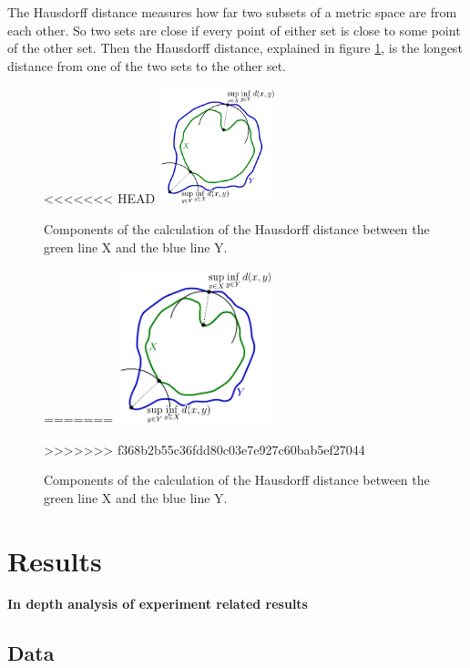 \documentclass[journal]{IEEEtran}
\begin{document}
	The Hausdorff distance measures how far two subsets of a metric space are from each other. So two sets are close if every point of either set is close 
	to some point of the other set. Then the Hausdorff distance, explained in figure \ref{fig:e3}, is the longest distance from one of the two sets to the other set.

	\begin{figure}[h]
		\centering
<<<<<<< HEAD
		\includegraphics[width=0.3\textwidth]{haussdorfGraphics.png}
		\caption{Components of the calculation of the Hausdorff distance between the green line X and the blue line Y.}
		\label{fig:figure3}
=======
		\includegraphics[width=0.4\textwidth]{haussdorfGraphics}
		\caption{Components of the calculation of the Hausdorff distance between the green line X and the blue line Y.}
		\label{fig:e3}
>>>>>>> f368b2b55c36fdd80c03e7e927c60bab5ef27044
	\end{figure}



\section{Results}
\textbf{In depth analysis of experiment related results}

\subsection{Data}
\end{document}
